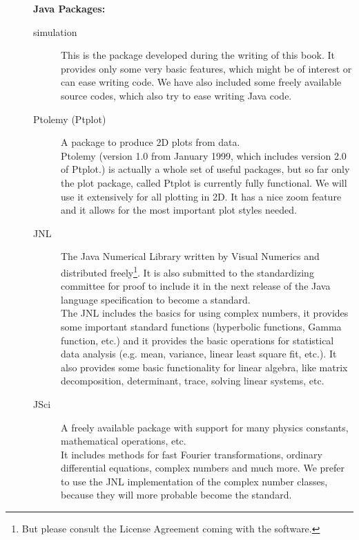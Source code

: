 \begin{description}
\item[] \textbf{Java Packages:}
\begin{description}
\item[simulation] This is the package developed during the writing
        of this book. It provides only some very basic features, which
        might be of interest or can ease writing code. We have also
        included some freely available source codes, which also
        try to ease writing Java code.
\item[Ptolemy (Ptplot)] A package to produce 2D plots from data. \\
        Ptolemy (version 1.0 from January 1999, which includes version
        2.0 of Ptplot.)
        is actually a whole set of useful packages, but so far only the
        plot package, called Ptplot is currently fully functional. We will
        use it extensively for all plotting in 2D. It has a nice
        zoom feature and it allows for the most important plot styles
        needed.
\item[JNL] The Java Numerical Library written by Visual Numerics and
        distributed freely\footnote{But please consult the License Agreement
        coming with the software.}. It is also submitted to the standardizing
        committee for proof to include it in the next release of the
        Java language specification to become a standard. \\
        The JNL includes the basics for using complex numbers, it
        provides some important standard functions (hyperbolic
        functions, Gamma function, etc.) and it provides 
        the basic operations for statistical data analysis (e.g. mean,
        variance, linear least square fit, etc.). It also provides some
        basic functionality for linear algebra, like matrix decomposition,
        determinant, trace, solving linear systems, etc.
\item[JSci] A freely available package with support for many 
  physics constants, mathematical operations, etc. \\
   It includes methods for fast Fourier transformations, ordinary differential 
   equations, complex numbers and much more. We prefer to use the JNL
   implementation of the complex number classes, because they will
   more probable become the standard.
\end{description}

\end{description}



